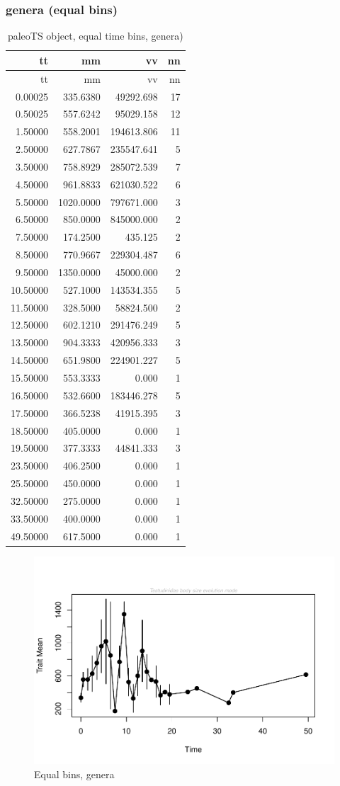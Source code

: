 \documentclass[]{article}
\begin{document}
\subsubsection{genera (equal bins)}\label{genera-equal-bins}

\begin{longtable}[]{@{}rrrr@{}}
\caption{paleoTS object, equal time bins, genera)}\tabularnewline
\toprule
tt & mm & vv & nn\tabularnewline
\midrule
\endfirsthead
\toprule
tt & mm & vv & nn\tabularnewline
\midrule
\endhead
0.00025 & 335.6380 & 49292.698 & 17\tabularnewline
0.50025 & 557.6242 & 95029.158 & 12\tabularnewline
1.50000 & 558.2001 & 194613.806 & 11\tabularnewline
2.50000 & 627.7867 & 235547.641 & 5\tabularnewline
3.50000 & 758.8929 & 285072.539 & 7\tabularnewline
4.50000 & 961.8833 & 621030.522 & 6\tabularnewline
5.50000 & 1020.0000 & 797671.000 & 3\tabularnewline
6.50000 & 850.0000 & 845000.000 & 2\tabularnewline
7.50000 & 174.2500 & 435.125 & 2\tabularnewline
8.50000 & 770.9667 & 229304.487 & 6\tabularnewline
9.50000 & 1350.0000 & 45000.000 & 2\tabularnewline
10.50000 & 527.1000 & 143534.355 & 5\tabularnewline
11.50000 & 328.5000 & 58824.500 & 2\tabularnewline
12.50000 & 602.1210 & 291476.249 & 5\tabularnewline
13.50000 & 904.3333 & 420956.333 & 3\tabularnewline
14.50000 & 651.9800 & 224901.227 & 5\tabularnewline
15.50000 & 553.3333 & 0.000 & 1\tabularnewline
16.50000 & 532.6600 & 183446.278 & 5\tabularnewline
17.50000 & 366.5238 & 41915.395 & 3\tabularnewline
18.50000 & 405.0000 & 0.000 & 1\tabularnewline
19.50000 & 377.3333 & 44841.333 & 3\tabularnewline
23.50000 & 406.2500 & 0.000 & 1\tabularnewline
25.50000 & 450.0000 & 0.000 & 1\tabularnewline
32.50000 & 275.0000 & 0.000 & 1\tabularnewline
33.50000 & 400.0000 & 0.000 & 1\tabularnewline
49.50000 & 617.5000 & 0.000 & 1\tabularnewline
\bottomrule
\end{longtable}

\begin{figure}[htbp]
\centering
\includegraphics{MA_JJ_files/figure-latex/Play around with time bins, generic level-1.pdf}
\caption{Equal bins, genera}
\end{figure}
\end{document}
